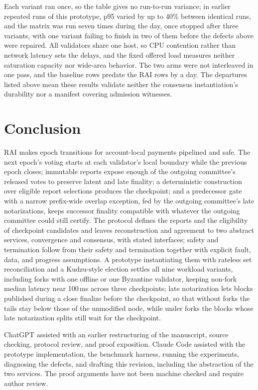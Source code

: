 Each variant ran once, so the table gives no run-to-run variance; in earlier repeated runs of this prototype, p95 varied by up to 40\% between identical runs, and the matrix was run seven times during the day, once stopped after three variants, with one variant failing to finish in two of them before the defects above were repaired. All validators share one host, so CPU contention rather than network latency sets the delays, and the fixed offered load measures neither saturation capacity nor wide-area behavior. The two arms were not interleaved in one pass, and the baseline rows predate the RAI rows by a day. The departures listed above mean these results validate neither the consensus instantiation's durability nor a manifest covering admission witnesses.

\section{Conclusion}
RAI makes epoch transitions for account-local payments pipelined and safe. The next epoch's voting starts at each validator's local boundary while the previous epoch closes; immutable reports expose enough of the outgoing committee's released votes to preserve latent and late finality; a deterministic construction over eligible report selections produces the checkpoint; and a predecessor gate with a narrow prefix-wide overlap exception, fed by the outgoing committee's late notarizations, keeps successor finality compatible with whatever the outgoing committee could still certify. The protocol defines the reports and the eligibility of checkpoint candidates and leaves reconstruction and agreement to two abstract services, convergence and consensus, with stated interfaces; safety and termination follow from their safety and termination together with explicit fault, data, and progress assumptions. A prototype instantiating them with rateless set reconciliation and a Kudzu-style election settles all nine workload variants, including forks with one offline or one Byzantine validator, keeping non-fork median latency near 100\,ms across three checkpoints; late notarization lets blocks published during a close finalize before the checkpoint, so that without forks the tails stay below those of the unmodified node, while under forks the blocks whose late notarization splits still wait for the checkpoint.

ChatGPT assisted with an earlier restructuring of the manuscript, source checking, protocol review, and proof exposition. Claude Code assisted with the prototype implementation, the benchmark harness, running the experiments, diagnosing the defects, and drafting this revision, including the abstraction of the two services. The proof arguments have not been machine checked and require author review.
